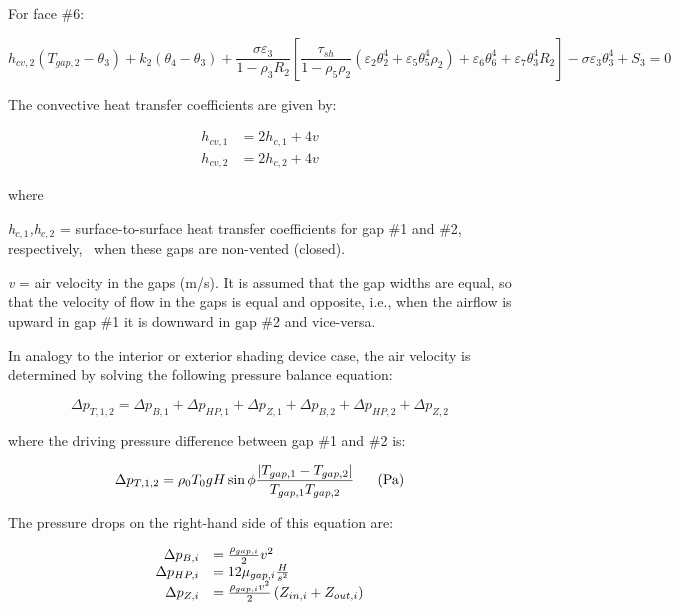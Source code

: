For face \#6:

\begin{equation}
h_{cv,2} (T_{gap,2}-\theta_3) + k_2 (\theta_4-\theta_3) +
    \frac{\sigma \varepsilon_3}{1-\rho_3 R_2} \left[
      \frac{\tau_{sh}}{1-\rho_5\rho_2} (
        \varepsilon_2 \theta_2^4 + \varepsilon_5\theta_5^4\rho_2
      )
      + \varepsilon_6\theta_6^4 + \varepsilon_7\theta_3^4R_2
    \right]-{\sigma \varepsilon_3 \theta_3^4}+{S_3}=0
\end{equation}

The convective heat transfer coefficients are given by:

\begin{equation}
  \begin{array}{rl}
    h_{cv,1} &= 2 h_{c,1} + 4v \\
    h_{cv,2} &= 2 h_{c,2} + 4v
  \end{array}
\label{eq:hcv1hcv2Array}
\end{equation}

where

\emph{h\(_{c,1}\),h\(_{c,2}\)} = surface-to-surface heat transfer coefficients for gap \#1 and \#2,~ respectively,~ when these gaps are non-vented (closed).

\emph{v} = air velocity in the gaps (m/s). It is assumed that the gap widths are equal, so that the velocity of flow in the gaps is equal and opposite, i.e., when the airflow is upward in gap \#1 it is downward in gap \#2 and vice-versa.

In analogy to the interior or exterior shading device case, the air velocity is determined by solving the following pressure balance equation:

\begin{equation}
\Delta {p_{T,1,2}} = \Delta {p_{B,1}} + \Delta {p_{HP,1}} + \Delta {p_{Z,1}} + \Delta {p_{B,2}} + \Delta {p_{HP,2}} + \Delta {p_{Z,2}}
\end{equation}

where the driving pressure difference between gap \#1 and \#2 is:

\begin{equation}
\Delta {p_{T,1,2}} = {\rho_0}{T_0}gH\sin \phi \frac{{\left| {{T_{gap,1}} - {T_{gap,2}}} \right|}}{{{T_{gap,1}}{T_{gap,2}}}}{\rm{~~~~~(Pa)}}
\label{eq:DeltapT12Equation}
\end{equation}

The pressure drops on the right-hand side of this equation are:

\begin{equation}
  \begin{array}{rl}
    \Delta p_{B,i} &= \frac{\rho_{gap,i}}{2} v^2 \\
    \Delta p_{HP,i} &= 12 \mu_{gap,i} \frac{H}{s^2} \\
    \Delta p_{Z,i} &= \frac{\rho_{gap,i} v^2}{2}\PB{Z_{in,i} + Z_{out,i}}
  \end{array}
\end{equation}

